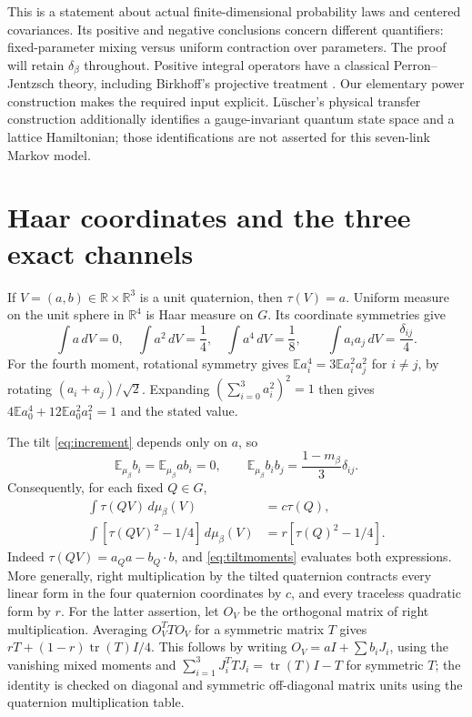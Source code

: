 \documentclass[11pt]{article}
\newcommand{\R}{\mathbb R}\newcommand{\E}{\mathbb E}
\begin{document}
This is a statement about actual finite-dimensional probability laws
and centered covariances. Its positive and negative conclusions concern
different quantifiers: fixed-parameter mixing versus uniform contraction
over parameters. The proof will retain $\delta_\beta$ throughout.
Positive integral operators have a classical Perron--Jentzsch theory,
including Birkhoff's projective treatment \cite{Birkhoff}. Our elementary
power construction makes the required input explicit. L\"uscher's
physical transfer construction \cite{Luscher} additionally identifies a
gauge-invariant quantum state space and a lattice Hamiltonian; those
identifications are not asserted for this seven-link Markov model.

\section{Haar coordinates and the three exact channels}
If $V=(a,b)\in\R\times\R^3$ is a unit quaternion, then $\tau(V)=a$.
Uniform measure on the unit sphere in $\R^4$ is Haar measure on $G$.
Its coordinate symmetries give
\begin{equation}\label{eq:Haarmoments}
 \int a\,dV=0,\quad \int a^2\,dV=\frac14,\quad
 \int a^4\,dV=\frac18,\qquad
 \int a_i a_j\,dV=\frac{\delta_{ij}}4.
\end{equation}
For the fourth moment, rotational symmetry gives
$\E a_i^4=3\E a_i^2a_j^2$ for $i\ne j$, by rotating
$(a_i+a_j)/\sqrt2$. Expanding $(\sum_{i=0}^3a_i^2)^2=1$
then gives $4\E a_0^4+12\E a_0^2a_1^2=1$ and the stated value.

The tilt \eqref{eq:increment} depends only on $a$, so
\begin{equation}\label{eq:tiltmoments}
 \E_{\mu_\beta}b_i=\E_{\mu_\beta}ab_i=0,\qquad
 \E_{\mu_\beta}b_i b_j=\frac{1-m_\beta}{3}\delta_{ij}.
\end{equation}
Consequently, for each fixed $Q\in G$,
\begin{align}
 \int\tau(QV)\,d\mu_\beta(V)&=c\tau(Q),\label{eq:linear}\\
 \int[\tau(QV)^2-1/4]\,d\mu_\beta(V)
 &=r[\tau(Q)^2-1/4].\label{eq:quadratic}
\end{align}
Indeed $\tau(QV)=a_Qa-b_Q\cdot b$, and
\eqref{eq:tiltmoments} evaluates both expressions. More generally,
right multiplication by the tilted quaternion contracts every linear
form in the four quaternion coordinates by $c$, and every traceless
quadratic form by $r$. For the latter assertion, let $O_V$ be the
orthogonal matrix of right multiplication. Averaging
$O_V^TTO_V$ for a symmetric matrix $T$ gives
$rT+(1-r)\operatorname{tr}(T)I/4$.
This follows by writing $O_V=aI+\sum b_iJ_i$, using the vanishing
mixed moments and
$\sum_{i=1}^3J_i^TTJ_i=\operatorname{tr}(T)I-T$ for symmetric $T$;
the identity is checked on diagonal and symmetric off-diagonal matrix
units using the quaternion multiplication table.
\end{document}
